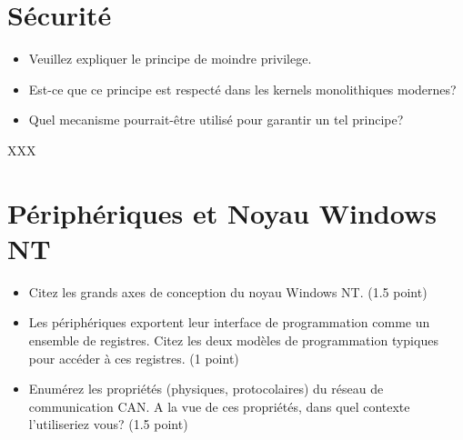 % 
%

\section{S\'ecurit\'e
         }


\begin{itemize}
  \item
    Veuillez expliquer le principe de moindre privilege.
  \item
    Est-ce que ce principe est respect\'e dans les kernels monolithiques
    modernes?
  \item
    Quel mecanisme pourrait-\^etre utilis\'e pour garantir un tel principe?
\end{itemize}

\begin{correction}

XXX

\end{correction}

%
%

\section{P\'eriph\'eriques et Noyau Windows NT
         }

\begin{itemize}
\item
  Citez les grands axes de conception du noyau Windows NT. (1.5 point)
\item
  Les p\'eriph\'eriques exportent leur interface de programmation comme un ensemble
  de registres. Citez les deux mod\`eles de programmation typiques pour acc\'eder
  \`a ces registres. (1 point)
\item
  Enum\'erez les propri\'et\'es (physiques, protocolaires) du r\'eseau de communication
  CAN. A la vue de ces propri\'et\'es, dans quel contexte l'utiliseriez vous? (1.5 point)
\end{itemize}

